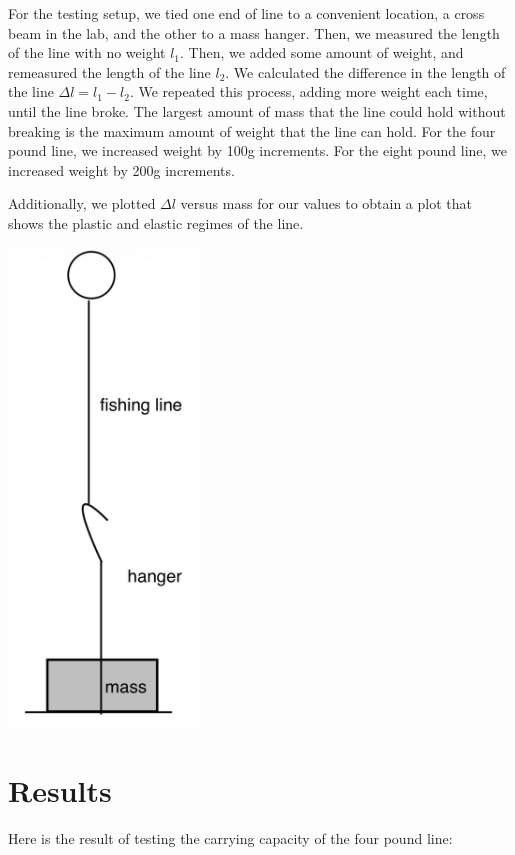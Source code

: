 \documentclass[12pt]{article}
\begin{document}
For the testing setup, we tied one end of line to a convenient location, a cross beam in the lab, and the other to a mass hanger. Then, we measured the length of the line with no weight \(l_1\). Then, we added some amount of weight, and remeasured the length of the line \(l_2\). We calculated the difference in the length of the line \(\Delta l = l_1 - l_2\). We repeated this process, adding more weight each time, until the line broke. The largest amount of mass that the line could hold without breaking is the maximum amount of weight that the line can hold. For the four pound line, we increased weight by 100g increments. For the eight pound line, we increased weight by 200g increments.

Additionally, we plotted \(\Delta l\) versus mass for our values to obtain a plot that shows the plastic and elastic regimes of the line.

\begin{center}
\includegraphics[height=5in]{./lab4hanger.png}
\end{center}
\section{Results}
\label{sec:orgcae8768}

Here is the result of testing the carrying capacity of the four pound line:
\end{document}
